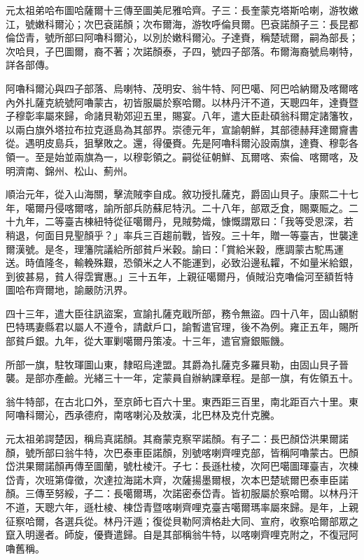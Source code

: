 \begin{pinyinscope}
元太祖弟哈布圖哈薩爾十三傳至圖美尼雅哈齊。子三：長奎蒙克塔斯哈喇，游牧嫩江，號嫩科爾沁；次巴袞諾顏；次布爾海，游牧呼倫貝爾。巴袞諾顏子三：長昆都倫岱青，號所部曰阿嚕科爾沁，以別於嫩科爾沁。子達賚，稱楚琥爾，嗣為部長；次哈貝，子巴圖爾，裔不著；次諾顏泰，子四，號四子部落。布爾海裔號烏喇特，詳各部傳。

阿嚕科爾沁與四子部落、烏喇特、茂明安、翁牛特、阿巴噶、阿巴哈納爾及喀爾喀內外扎薩克統號阿嚕蒙古，初皆服屬於察哈爾。以林丹汗不道，天聰四年，達賚暨子穆彰率屬來歸，命諸貝勒郊迎五里，賜宴。八年，遣大臣赴碩翁科爾定諸籓牧，以兩白旗外塔拉布拉克遜島為其部界。崇德元年，宣諭朝鮮，其部德赫拜達爾齎書從。遇明皮島兵，狙擊敗之。還，得優賚。先是阿嚕科爾沁設兩旗，達賚、穆彰各領一。至是始並兩旗為一，以穆彰領之。嗣從征朝鮮、瓦爾喀、索倫、喀爾喀，及明濟南、錦州、松山、薊州。

順治元年，從入山海關，擊流賊李自成。敘功授扎薩克，爵固山貝子。康熙二十七年，噶爾丹侵喀爾喀，諭所部兵防蘇尼特汛。二十八年，部眾乏食，賜粟賑之。二十九年，二等臺吉棟紐特從征噶爾丹，見賊勢熾，慷慨謂眾曰：「我等受恩深，若稍退，何面目見聖顏乎？」率兵三百趨前戰，皆歿。三十年，贈一等臺吉，世襲達爾漢號。是冬，理籓院議給所部貧戶米穀。諭曰：「賞給米穀，應調蒙古駝馬運送。時值隆冬，輸輓殊艱，恐領米之人不能運到，必致沿邊私糶，不如量米給銀，到彼甚易，貧人得霑實惠。」三十五年，上親征噶爾丹，偵賊沿克嚕倫河至額哲特圖哈布齊爾地，諭嚴防汛界。

四十三年，遣大臣往訊盜案，宣諭扎薩克戢所部，務令無盜。四十八年，固山額駙巴特瑪妻縣君以屬人不遵令，請獻戶口，諭暫遣官理，後不為例。雍正五年，賜所部貧戶銀。九年，從大軍剿噶爾丹策凌。十三年，遣官齎銀賑饑。

所部一旗，駐牧琿圖山東，隸昭烏達盟。其爵為扎薩克多羅貝勒，由固山貝子晉襲。是部亦產鹼。光緒三十一年，定蒙員自辦納課章程。是部一旗，有佐領五十。

翁牛特部，在古北口外，至京師七百六十里。東西距三百里，南北距百六十里。東阿嚕科爾沁，西承德府，南喀喇沁及敖漢，北巴林及克什克騰。

元太祖弟諤楚因，稱烏真諾顏。其裔蒙克察罕諾顏。有子二：長巴顏岱洪果爾諾顏，號所部曰翁牛特，次巴泰車臣諾顏，別號喀喇齊哩克部，皆稱阿嚕蒙古。巴顏岱洪果爾諾顏再傳至圖蘭，號杜棱汗。子七：長遜杜棱，次阿巴噶圖琿臺吉，次棟岱青，次班第偉徵，次達拉海諾木齊，次薩揚墨爾根，次本巴楚琥爾巴泰車臣諾顏。三傳至努綏，子二：長噶爾瑪，次諾密泰岱青。皆初服屬於察哈爾。以林丹汗不道，天聰六年，遜杜棱、棟岱青暨喀喇齊哩克臺吉噶爾瑪率屬來歸。是年，上親征察哈爾，各選兵從。林丹汗遁；復從貝勒阿濟格赴大同、宣府，收察哈爾部眾之竄入明邊者。師旋，優賚遣歸。自是其部稱翁牛特，以喀喇齊哩克附之，不復冠阿嚕舊稱。


\end{pinyinscope}
